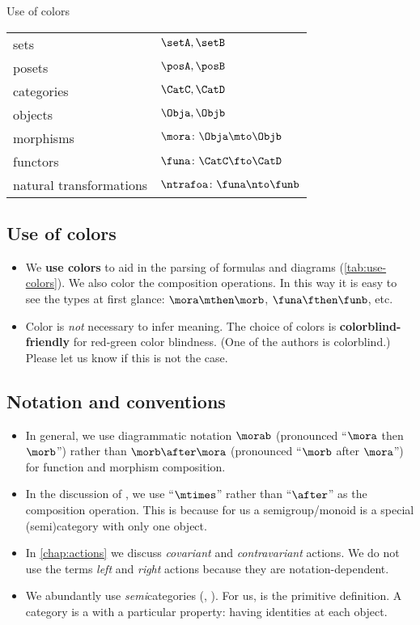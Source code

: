 \begin{margintable}
    \caption{Use of colors}
    \label{tab:use-colors}
    \begin{tabular}{p{2.5cm}l}
        sets                           & $\setA, \setB$ \\
        posets                         & $\posA, \posB$ \\
        categories                     & $\CatC, \CatD$ \\
        objects                        & $\Obja, \Objb$ \\
        morphisms                      & $\mora \colon \Obja \mto \Objb$ \\
        functors                       & $\funa \colon \CatC \fto \CatD$ \\
        natural \mbox{transformations} & $\ntrafoa \colon \funa \nto \funb$
    \end{tabular}
\end{margintable}
\subsection{Use of colors}
\begin{itemize}
    \item We \textbf{use colors} to aid in the parsing of formulas and diagrams (\cref{tab:use-colors}).
          We also color the composition operations.
          In this way it is easy to see the types at first glance:
          $\mora\mthen\morb$, $\funa\fthen\funb$, etc.
    \item Color is \emph{not} necessary to infer meaning.
          The choice of colors is \textbf{colorblind-friendly} for red-green color blindness.
          (One of the authors is colorblind.)
          Please let us know if this is not the case.
\end{itemize}

\subsection{Notation and conventions}
\begin{itemize}
    \item In general, we use diagrammatic notation $\morab$ (pronounced ``$\mora$ then $\morb$'') rather than $\morb \after \mora$ (pronounced ``$\morb$ after $\mora$'') for function and morphism composition.
    \item In the discussion of , we use ``$\mtimes$'' rather than ``$\after$'' as the  composition operation.
          This is because for us a semigroup/monoid is a special (semi)category with only one object.
    \item In \cref{chap:actions} we discuss \emph{covariant} and \emph{contravariant} actions.
          We do not use the terms \emph{left} and \emph{right} actions because they are notation-dependent.
    \item We abundantly use \emph{semi}categories (, \etc).
          For us,  is the primitive definition.
          A category is a  with a particular property: having identities at each object.
\end{itemize}

